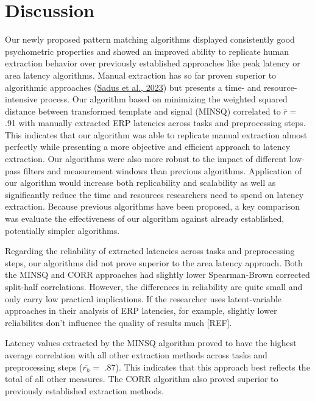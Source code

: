 \documentclass[
  man]{apa7}
\begin{document}
\hypertarget{discussion}{%
\section{Discussion}\label{discussion}}

Our newly proposed pattern matching algorithms displayed consistently good psychometric properties and showed an improved ability to replicate human extraction behavior over previously established approaches like peak latency or area latency algorithms. Manual extraction has so far proven superior to algorithmic approaches (\protect\hyperlink{ref-sadus2023multiverse}{Sadus et al., 2023}) but presents a time- and resource-intensive process. Our algorithm based on minimizing the weighted squared distance between transformed template and signal (MINSQ) correlated to \(\overline{r} =\) .91 with manually extracted ERP latencies across tasks and preprocessing steps. This indicates that our algorithm was able to replicate manual extraction almost perfectly while presenting a more objective and efficient approach to latency extraction. Our algorithms were also more robust to the impact of different low-pass filters and measurement windows than previous algorithms. Application of our algorithm would increase both replicability and scalability as well as significantly reduce the time and resources researchers need to spend on latency extraction. Because previous algorithms have been proposed, a key comparison was evaluate the effectiveness of our algorithm against already established, potentially simpler algorithms.

Regarding the reliability of extracted latencies across tasks and preprocessing steps, our algorithms did not prove superior to the area latency approach. Both the MINSQ and CORR approaches had slightly lower Spearman-Brown corrected split-half correlations. However, the differences in reliability are quite small and only carry low practical implications. If the researcher uses latent-variable approaches in their analysis of ERP latencies, for example, slightly lower reliabilites don't influence the quality of results much {[}REF{]}.

Latency values extracted by the MINSQ algorithm proved to have the highest average correlation with all other extraction methods across tasks and preprocessing steps (\(\overline{r_{h}} =\) .87). This indicates that this approach best reflects the total of all other measures. The CORR algorithm also proved superior to previously established extraction methods.
\end{document}
